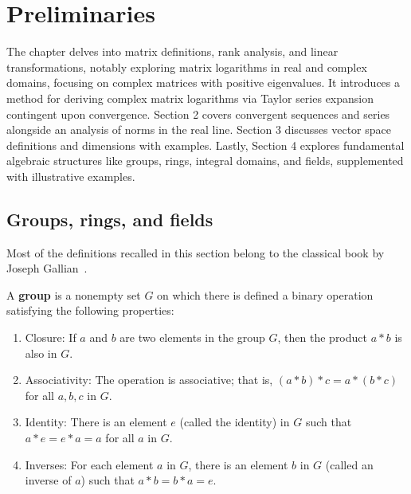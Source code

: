 \chapter{Preliminaries}
The chapter delves into matrix definitions, rank analysis, and linear transformations, notably exploring matrix logarithms in real and complex domains, focusing on complex matrices with positive eigenvalues. It introduces a method for deriving complex matrix logarithms via Taylor series expansion contingent upon convergence. Section 2 covers convergent sequences and series alongside an analysis of norms in the real line. Section 3 discusses vector space definitions and dimensions with examples. Lastly, Section 4 explores fundamental algebraic structures like groups, rings, integral domains, and fields, supplemented with illustrative examples.



\section{Groups, rings, and fields}
Most of the definitions recalled in this section belong to the classical book by Joseph Gallian~\cite{gallian2021contemporary}.
\begin{definition}
A \textbf{group} is a nonempty set \(G\) on which there is defined a binary operation satisfying the following properties:
\begin{enumerate}
    \item Closure: If \(a\) and \(b\) are two elements in the group \(G\), then the product \(a * b\) is also in \(G\).
    \item Associativity: The operation is associative; that is, \((a * b) * c = a * (b * c)\) for all \(a, b, c\) in \(G\).
    \item Identity: There is an element \(e\) (called the identity) in \(G\) such that \(a * e = e * a = a\) for all \(a\) in \(G\).
    \item Inverses: For each element \(a\) in \(G\), there is an element \(b\) in \(G\) (called an inverse of \(a\)) such that \(a * b = b * a = e\).
\end{enumerate}
    
\end{definition}

